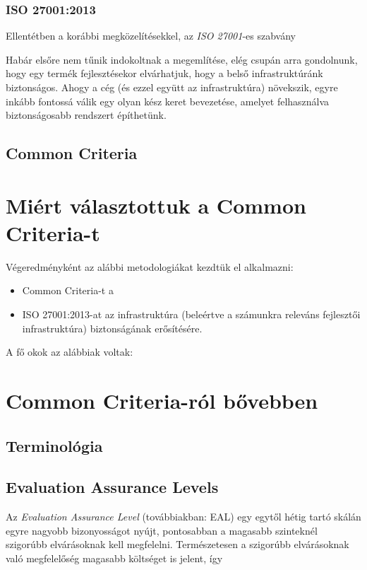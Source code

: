 \subsubsection{ISO 27001:2013}
Ellentétben a korábbi megközelítésekkel, az \emph{ISO 27001}-es szabvány 

Habár elsőre nem tűnik indokoltnak a megemlítése, elég csupán arra gondolnunk, hogy
egy termék fejlesztésekor elvárhatjuk, hogy a belső infrastruktúránk biztonságos.
Ahogy a cég (és ezzel együtt az infrastruktúra) növekszik, egyre inkább fontossá
válik egy olyan kész keret bevezetése, amelyet felhasználva biztonságosabb rendszert építhetünk.

\subsection{Common Criteria}

\section{Miért választottuk a Common Criteria-t}

Végeredményként az alábbi metodologiákat kezdtük el alkalmazni:
\begin{itemize}
\item Common Criteria-t a 
\item{ISO 27001:2013-at az infrastruktúra (beleértve a számunkra releváns fejlesztői infrastruktúra)
    biztonságának erősítésére.}
\end{itemize}

A fő okok az alábbiak voltak:



\section{Common Criteria-ról bővebben}

\subsection{Terminológia}

\subsection{Evaluation Assurance Levels}

Az \emph{Evaluation Assurance Level} (továbbiakban: EAL) egy egytől hétig tartó skálán egyre nagyobb
bizonyosságot nyújt, pontosabban a magasabb szinteknél szigorúbb elvárásoknak kell megfelelni.
Természetesen a szigorúbb elvárásoknak való megfelelőség magasabb költséget is jelent,
így 

